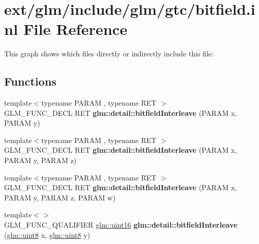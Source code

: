 \hypertarget{bitfield_8inl}{\section{ext/glm/include/glm/gtc/bitfield.inl File Reference}
\label{bitfield_8inl}
}
This graph shows which files directly or indirectly include this file\-:
\subsection*{Functions}
\begin{DoxyCompactItemize}
\item 
\hypertarget{namespaceglm_1_1detail_a39644ee418ae41e3393d1cb6191e32a7}{{\footnotesize template$<$typename P\-A\-R\-A\-M , typename R\-E\-T $>$ }\\G\-L\-M\-\_\-\-F\-U\-N\-C\-\_\-\-D\-E\-C\-L R\-E\-T {\bfseries glm\-::detail\-::bitfield\-Interleave} (P\-A\-R\-A\-M x, P\-A\-R\-A\-M y)}\label{namespaceglm_1_1detail_a39644ee418ae41e3393d1cb6191e32a7}

\item 
\hypertarget{namespaceglm_1_1detail_aa2fdd8f720417a13990873ba704a3426}{{\footnotesize template$<$typename P\-A\-R\-A\-M , typename R\-E\-T $>$ }\\G\-L\-M\-\_\-\-F\-U\-N\-C\-\_\-\-D\-E\-C\-L R\-E\-T {\bfseries glm\-::detail\-::bitfield\-Interleave} (P\-A\-R\-A\-M x, P\-A\-R\-A\-M y, P\-A\-R\-A\-M z)}\label{namespaceglm_1_1detail_aa2fdd8f720417a13990873ba704a3426}

\item 
\hypertarget{namespaceglm_1_1detail_a606f6dc8c8314159fafef68f820c2c65}{{\footnotesize template$<$typename P\-A\-R\-A\-M , typename R\-E\-T $>$ }\\G\-L\-M\-\_\-\-F\-U\-N\-C\-\_\-\-D\-E\-C\-L R\-E\-T {\bfseries glm\-::detail\-::bitfield\-Interleave} (P\-A\-R\-A\-M x, P\-A\-R\-A\-M y, P\-A\-R\-A\-M z, P\-A\-R\-A\-M w)}\label{namespaceglm_1_1detail_a606f6dc8c8314159fafef68f820c2c65}

\item 
\hypertarget{namespaceglm_1_1detail_ac59c574dc7900d87786f5a96f82ea6e7}{{\footnotesize template$<$$>$ }\\G\-L\-M\-\_\-\-F\-U\-N\-C\-\_\-\-Q\-U\-A\-L\-I\-F\-I\-E\-R \hyperlink{group__gtc__type__precision_gad8c2939e1fdd8e5828b31d95c52255d5}{glm\-::uint16} {\bfseries glm\-::detail\-::bitfield\-Interleave} (\hyperlink{group__gtc__type__precision_ga1a7dcd8aac97cc8020817c94049deff2}{glm\-::uint8} x, \hyperlink{group__gtc__type__precision_ga1a7dcd8aac97cc8020817c94049deff2}{glm\-::uint8} y)}\label{namespaceglm_1_1detail_ac59c574dc7900d87786f5a96f82ea6e7}


\end{DoxyCompactItemize}
